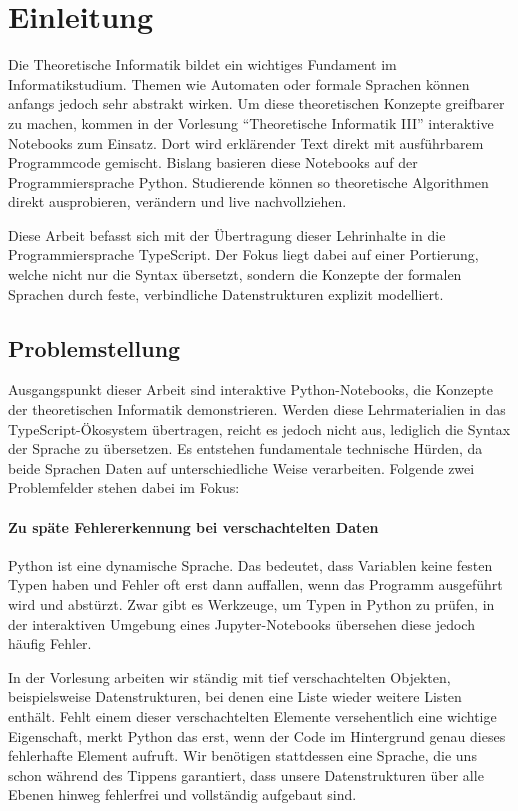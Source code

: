 
\section{Einleitung}
\label{sec:einleitung}

Die Theoretische Informatik bildet ein wichtiges Fundament im Informatikstudium. Themen wie Automaten oder formale Sprachen können anfangs jedoch sehr abstrakt wirken. Um diese theoretischen Konzepte greifbarer zu machen, kommen in der Vorlesung \enquote{Theoretische Informatik III} interaktive Notebooks zum Einsatz. Dort wird erklärender Text direkt mit ausführbarem Programmcode gemischt. Bislang basieren diese Notebooks auf der Programmiersprache Python. Studierende können so theoretische Algorithmen direkt ausprobieren, verändern und live nachvollziehen.

Diese Arbeit befasst sich mit der Übertragung dieser Lehrinhalte in die Programmiersprache TypeScript. Der Fokus liegt dabei auf einer Portierung, welche nicht nur die Syntax übersetzt, sondern die Konzepte der formalen Sprachen durch feste, verbindliche Datenstrukturen explizit modelliert.

\subsection{Problemstellung}
\label{subsec:problemstellung}

Ausgangspunkt dieser Arbeit sind interaktive Python-Notebooks, die Konzepte der theoretischen Informatik demonstrieren. Werden diese Lehrmaterialien in das TypeScript-Ökosystem übertragen, reicht es jedoch nicht aus, lediglich die Syntax der Sprache zu übersetzen. Es entstehen fundamentale technische Hürden, da beide Sprachen Daten auf unterschiedliche Weise verarbeiten. Folgende zwei Problemfelder stehen dabei im Fokus:

\paragraph*{Zu späte Fehlererkennung bei verschachtelten Daten}
Python ist eine dynamische Sprache. Das bedeutet, dass Variablen keine festen Typen haben und Fehler oft erst dann auffallen, wenn das Programm ausgeführt wird und abstürzt. Zwar gibt es Werkzeuge, um Typen in Python zu prüfen, in der interaktiven Umgebung eines Jupyter-Notebooks übersehen diese jedoch häufig Fehler. 

In der Vorlesung arbeiten wir ständig mit tief verschachtelten Objekten, beispielsweise Datenstrukturen, bei denen eine Liste wieder weitere Listen enthält. Fehlt einem dieser verschachtelten Elemente versehentlich eine wichtige Eigenschaft, merkt Python das erst, wenn der Code im Hintergrund genau dieses fehlerhafte Element aufruft. Wir benötigen stattdessen eine Sprache, die uns schon während des Tippens garantiert, dass unsere Datenstrukturen über alle Ebenen hinweg fehlerfrei und vollständig aufgebaut sind.

